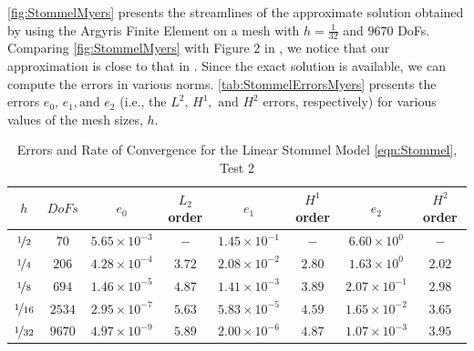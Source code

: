 \autoref{fig:StommelMyers} presents the streamlines of the approximate solution
obtained by using the Argyris Finite Element on a mesh with $h=\frac{1}{32}$ and
$9670$ DoFs. Comparing \autoref{fig:StommelMyers} with Figure $2$ in
\cite{Myers}, we notice that our approximation is close to that in \cite{Myers}.
Since the exact solution is available, we can compute the errors in various
norms. \autoref{tab:StommelErrorsMyers} presents the errors $e_0,\, e_1, \text{
and } e_2$ (i.e., the $L^2,\, H^1, \text{ and } H^2$ errors, respectively) for
various values of the mesh sizes, $h$.

\begin{table}%
\begin{center}
\begin{tabular}{|c|c|c|c|c|c|c|c|}%
  \hline
  $h$ & $DoFs$ & $e_0$ & $L_2$ order & $e_1$ & $H^1$ order & $e_2$ & $H^2$ order \\[0.2em] %
  \hline
  $\nicefrac{1}{2}$ & $70$ & $5.65\times 10^{-3}$ & $-$ & $1.45\times 10^{-1}$ & $-$ & $6.60\times 10^0$ & $-$ \\[0.2em] %
  $\nicefrac{1}{4}$ & $206$ & $4.28\times 10^{-4}$ & $3.72$ & $2.08\times 10^{-2}$ & $2.80$ & $1.63\times 10^0$ & $2.02$ \\[0.2em] %
  $\nicefrac{1}{8}$ & $694$ & $1.46\times 10^{-5}$ & $4.87$ & $1.41\times 10^{-3}$ & $3.89$ & $2.07\times 10^{-1}$ & $2.98$ \\[0.2em] %
  $\nicefrac{1}{16}$ & $2534$ & $2.95\times 10^{-7}$ & $5.63$ & $5.83\times 10^{-5}$ & $4.59$ & $1.65\times 10^{-2}$ & $3.65$ \\[0.2em] %
  $\nicefrac{1}{32}$ & $9670$ & $4.97\times 10^{-9}$ & $5.89$ & $2.00\times 10^{-6}$ & $4.87$ & $1.07\times 10^{-3}$ & $3.95$ \\[0.2em] %
  \hline
\end{tabular}
\end{center}
\caption{Errors and Rate of Convergence for the Linear Stommel Model \eqref{eqn:Stommel}, Test 2 \cite{Myers}}
\label{tab:StommelErrorsMyers}
\end{table}

